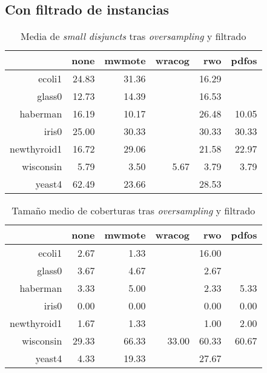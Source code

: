 \subsection{Con filtrado de instancias}
  \begin{table}[H]
  \centering
  \begin{tabular}{rrrrrr}
  \hline
  & none & mwmote & wracog & rwo & pdfos \\ 
  \hline
  ecoli1 & 24.83 & 31.36 &  & 16.29 &  \\ 
  glass0 & 12.73 & 14.39 &  & 16.53 &  \\ 
  haberman & 16.19 & 10.17 &  & 26.48 & 10.05 \\ 
  iris0 & 25.00 & 30.33 &  & 30.33 & 30.33 \\ 
  newthyroid1 & 16.72 & 29.06 &  & 21.58 & 22.97 \\ 
  wisconsin & 5.79 & 3.50 & 5.67 & 3.79 & 3.79 \\ 
  yeast4 & 62.49 & 23.66 &  & 28.53 &  \\ 
   \hline
\end{tabular}
  \caption{Media de \textit{small disjuncts} tras \textit{oversampling} y filtrado}
  \end{table}

  \begin{table}[H]
  \centering
  \begin{tabular}{rrrrrr}
    \hline
    & none & mwmote & wracog & rwo & pdfos \\ 
    \hline
    ecoli1 & 2.67 & 1.33 &  & 16.00 &  \\ 
    glass0 & 3.67 & 4.67 &  & 2.67 &  \\ 
    haberman & 3.33 & 5.00 &  & 2.33 & 5.33 \\ 
    iris0 & 0.00 & 0.00 &  & 0.00 & 0.00 \\ 
    newthyroid1 & 1.67 & 1.33 &  & 1.00 & 2.00 \\ 
    wisconsin & 29.33 & 66.33 & 33.00 & 60.33 & 60.67 \\ 
    yeast4 & 4.33 & 19.33 &  & 27.67 &  \\ 
    \hline
  \end{tabular}
  \caption{Tamaño medio de coberturas tras \textit{oversampling} y filtrado}
  \end{table}
  
